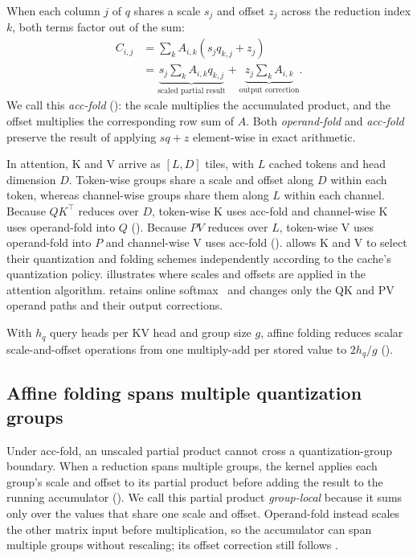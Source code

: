 When each column $j$ of $q$ shares a scale $s_j$ and offset $z_j$ across the reduction index $k$, both terms factor out of the sum:
\begin{equation}
  \begin{aligned}
    C_{i,j} &= \sum_k A_{i,k}(s_jq_{k,j}+z_j) \\
      &= \underbrace{s_j\sum_k A_{i,k}q_{k,j}}_{\text{scaled partial result}}+
         \underbrace{z_j\sum_k A_{i,k}}_{\text{output correction}}.
  \end{aligned}
  \label{eq:acc-fold}
\end{equation}
We call this \emph{acc-fold} (): the scale multiplies the accumulated product, and the offset multiplies the corresponding row sum of $A$.
Both \emph{operand-fold} and \emph{acc-fold} preserve the result of applying $sq+z$ element-wise in exact arithmetic.

In attention, K and V arrive as $[L,D]$ tiles, with $L$ cached tokens and head dimension $D$.
Token-wise groups share a scale and offset along $D$ within each token, whereas channel-wise groups share them along $L$ within each channel.
Because $QK^{\!\top}$ reduces over $D$, token-wise K uses acc-fold and channel-wise K uses operand-fold into $Q$ ().
Because $PV$ reduces over $L$, token-wise V uses operand-fold into $P$ and channel-wise V uses acc-fold ().
\sys{} allows K and V to select their quantization and folding schemes independently according to the cache's quantization policy.
 illustrates where scales and offsets are applied in the attention algorithm.
\sys{} retains online softmax~\cite{dao2023flashdecoding,dao2022flashattention,dao2024flashattention2} and changes only the QK and PV operand paths and their output corrections.



With $h_q$ query heads per KV head and group size $g$, affine folding reduces scalar scale-and-offset operations from one multiply-add per stored value to $2h_q/g$ ().

\subsection{Affine folding spans multiple quantization groups}
\label{sec:design-groups}

Under acc-fold, an unscaled partial product cannot cross a quantization-group boundary.
When a reduction spans multiple groups, the kernel applies each group's scale and offset to its partial product before adding the result to the running accumulator ().
We call this partial product \emph{group-local} because it sums only over the values that share one scale and offset.
Operand-fold instead scales the other matrix input before multiplication, so the accumulator can span multiple groups without rescaling; its offset correction still follows .

